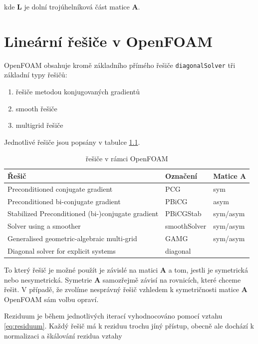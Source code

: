 \documentclass[a4paper,12pt]{report}
\theoremstyle{remark}
\begin{document}
kde $\boldsymbol{L}$ je dolní trojúhelníková část matice $\boldsymbol{A}$.
	
	
	{\let\clearpage\relax \chapter{Lineární řešiče v OpenFOAM}}

OpenFOAM obsahuje kromě základního přímého řešiče \texttt{diagonalSolver} tři základní typy řešičů:
\begin{enumerate}
	\item řešiče metodou konjugovaných gradientů 
	\item smooth řešiče
	\item multigrid řešiče
\end{enumerate}

Jednotlivé řešiče jsou popsány v tabulce \ref{table:solvers}.

\begin{table}[H]
	\centering
	\caption{řešiče v rámci OpenFOAM}
	\renewcommand{\arraystretch}{1.7}
	\begin{tabular}{*3l}
		\toprule
		\textbf{Řešič} & \textbf{Označení}&\textbf{Matice $\boldsymbol{A}$}\\
		\midrule
		{\small Preconditioned conjugate gradient}& PCG& sym\\
		{\small Preconditioned bi-conjugate gradient}& PBiCG&asym \\		
		{\small Stabilized Preconditioned (bi-)conjugate gradient}& PBiCGStab&sym/asym  \\
		{\small Solver using a smoother}& smoothSolver&sym/asym \\
		{\small Generalised geometric-algebraic multi-grid}& GAMG&sym/asym  \\
		{\small Diagonal solver for explicit systems}& 	diagonal \\
	
		\bottomrule
	\end{tabular}
	
	\label{table:solvers}
\end{table}
		
To který řešič je možné použít je závislé na matici $\boldsymbol{A}$ a tom, jestli je symetrická nebo nesymetrická. Symetrie $\boldsymbol{A}$ samozřejmě závisí na rovnicích, které chceme řešit. V případě, že zvolíme nesprávný řešič vzhledem k symetričnosti matice $\boldsymbol{A}$ OpenFOAM sám volbu opraví.

Reziduum je během jednotlivých iterací vyhodnocováno pomocí vztahu \eqref{eq:residuum}. Každý řešič má k reziduu trochu jíný přístup, obecně ale dochází k normalizaci a škálování rezidua vztahy
\end{document}
